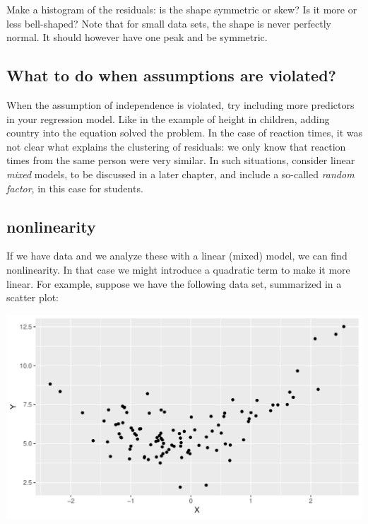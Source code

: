 \documentclass[]{report}\usepackage[]{graphicx}\usepackage[]{color}
\makeatletter
\def\maxwidth{ %
  \ifdim\Gin@nat@width>\linewidth
    \linewidth
  \else
    \Gin@nat@width
  \fi
}
\newenvironment{knitrout}{}{} %
\makeatother
\begin{document}
Make a histogram of the residuals: is the shape symmetric or skew? Is it more or less bell-shaped? Note that for small data sets, the shape is never perfectly normal. It should however have one peak and be symmetric.

\subsection{What to do when assumptions are violated?}

When the assumption of independence is violated, try including more predictors in your regression model. Like in the example of height in children, adding country into the equation solved the problem. In the case of reaction times, it was not clear what explains the clustering of residuals: we only know that reaction times from the same person were very similar. In such situations, consider linear \textit{mixed} models, to be discussed in a later chapter, and include a so-called \textit{random factor}, in this case for students. 



\subsection{nonlinearity}
If we have data and we analyze these with a linear (mixed) model, we can find nonlinearity. In that case we might introduce a quadratic term to make it more linear. For example, suppose we have the following data set, summarized in a scatter plot:

\begin{knitrout}
\color{fgcolor}

{\centering \includegraphics[width=\maxwidth]{figure/nonpar1-1} 

}



\end{knitrout}
\end{document}
